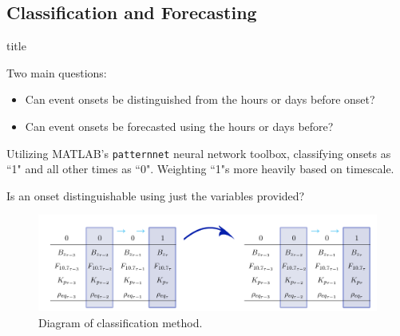 \documentclass[xcolor={dvipsnames,table}]{beamer}
\newcommand{\subheader}{    		\begin{center}
  	\begin{beamercolorbox}[sep=4pt,center,shadow=true,rounded=true]{title}
  		\usebeamerfont{title}\subsecname\par%
  	\end{beamercolorbox}
  	\vfill
  	\end{center}}
\begin{document}
\subsection{Classification and Forecasting}
\begin{frame}
	\subheader
	Two main questions:
	\begin{itemize}
		\item Can event onsets be distinguished from the hours or days before onset?
		\item Can event onsets be forecasted using the hours or days before?
	\end{itemize}
	Utilizing MATLAB's \texttt{patternnet} neural network toolbox, classifying onsets as ``1" and all other times as ``0". Weighting ``1"s more heavily based on timescale.
\end{frame}

\begin{frame}
Is an onset distinguishable using just the variables provided?
	\begin{figure}[htp!]
		\centering
		\includegraphics[width=1\linewidth]{Figures/CH5/ClassifyGraphic2.png}
		\caption{Diagram of classification method.}
		\label{fig:ClassifyDiagram}
	\end{figure}
\end{frame}
\end{document}
